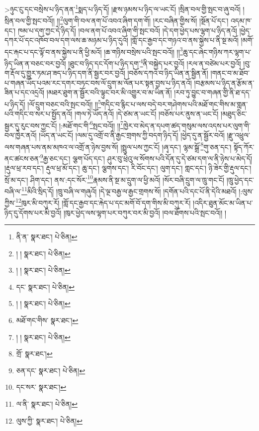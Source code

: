 >ཉུང་ངུ་དང་བསྲེས་པ་ཉིད་ནན་\footnote{ནི་ན་  སྣར་ཐང་།  པེ་ཅིན། }སྨད་པ་ཉིད་དོ། །རྫས་ཉམས་པ་ཉིད་ལ་ཡང་ངོ། །སྲིན་བལ་གྱི་སྤང་བ་ཞུ་བའོ། །སྲིན་བལ་གྱི་སྤང་བའོ།། །།\footnote{། །  སྣར་ཐང་།  པེ་ཅིན། }ལུག་གི་བལ་ནག་པོ་འབའ་ཞིག་དག་གོ། །རང་བཞིན་གྱིས་སོ། །སྔོན་པོ་དང་། འདམ་ཁ་དང་། ཁམ་པ་དག་ཀྱང་དེ་ཉིད་དོ། །བལ་ནག་པོ་འབའ་ཞིག་གི་སྤང་བའོ། །དེ་དག་ཕྱེད་པས་ལྷག་པ་ཉིད་ནའོ། །ཕྱེད་དཀར་པོ་དང་འཁོབ་བལ་དག་ལས་ཆ་མཉམ་པ་ཉིད་དུའོ། །གློ་དང་རྒྱབ་དང་གཉའ་བ་ནས་སྐྱེས་པ་ནི་སྔ་མའོ། །མགོ་དང་རྐང་པ་དང་ལྟོ་བ་ནས་སྐྱེས་པ་ནི་ཕྱི་མའོ། །ཆ་གཉིས་བསྲེས་པའི་སྤང་བའོ།། །།\footnote{། །  སྣར་ཐང་།  པེ་ཅིན། }ཆུ་དང་ཞེང་གཉིས་ཀར་ལྷག་པ་ཉིད་ཡིན་ན་བཅང་བར་བྱའོ། །ཐུང་བ་ཉིད་དང་དོག་པ་ཉིད་དག་\footnote{དང་  སྣར་ཐང་།  པེ་ཅིན། }ནི་བསྐྱེད་པར་བྱའོ། །རལ་ན་བཙེམ་པར་བྱའོ། །བུ་ག་རྡོལ་དུ་གྱུར་ཏམ་ཤ་ཟད་པ་ཉིད་དག་ནི་སྦྱར་བར་བྱའོ། །བཅོས་དཀའ་བ་ཉིད་ཡིན་ན་སྦྱིན་ནོ། །གནང་བ་མ་ཐོབ་པ་གཞན་ཡོད་པའམ་རང་དགར་བཏང་བས་ལོ་དྲུག་མ་ལོན་པར་སྟན་བྱས་པ་ཉིད་ནའོ། །བརྩམས་པ་ཉིད་ན་རྩོམ་ན་ཟིན་པ་དང་འདྲའོ། །མཐར་ཐུག་ན་སྦྱོར་བའི་ལྟུང་བར་མི་འགྱུར་བ་མ་ཡིན་ནོ། །རབ་ཏུ་བྱུང་བ་གཞན་གྱི་ནི་ཐ་དད་པ་ཉིད་དོ། །ལོ་དྲུག་བཅང་བའི་སྤང་བའོ།། །།\footnote{། །  སྣར་ཐང་།  པེ་ཅིན། }གདིང་བ་རྙིང་པ་ལས་བདེ་བར་གཤེགས་པའི་མཐོ་གང་གིས་མ་གླན་པའི་གདིང་བ་སར་པ་སྤྱོད་ནའོ། །གལ་ཏེ་ཡོད་ནའོ། །དེ་ཙམ་ན་ཡང་ངོ། །བཅོས་པར་ནུས་ན་ཡང་ངོ། །མཐུད་ཅིང་སྦྱར་དུ་རུང་བས་ཀྱང་ངོ། །:མཐོ་གང་གི་\footnote{མཐོ་གང་གིས་  སྣར་ཐང་། }སྤང་བའོ།། །།\footnote{། །  སྣར་ཐང་།  པེ་ཅིན། }ཁྱེར་བ་མེད་ན་དཔག་ཚད་གསུམ་ལས་འདས་པར་ལུག་གི་བལ་ཁྱེར་ནའོ། །ཡོད་ན་ཡང་ངོ། །ལམ་དུ་འགྲོ་བ་ནི་རྒྱང་གྲགས་ཀྱི་བདག་ཉིད་དོ། །ཕྱེད་དུ་ན་སྦྱོར་བའོ། །རྫུ་འཕྲུལ་ལས་གཞན་པས་ནམ་མཁའ་ལ་འགྲོ་ན་ཉེས་བྱས་སོ། །སྤྲུལ་པས་ཀྱང་ངོ། །ཞྭ་དང་། ལྷམ་སྒྲོ་\footnote{གྲོ་  སྣར་ཐང་། }གུ་ཅན་དང་། སྟོད་ཀོར་ནང་ཚངས་ཅན་\footnote{ཅན་དང་  སྣར་ཐང་།  པེ་ཅིན། }རྒྱ་ཅང་དང་། ལྕག་པོད་དང་། ཤུར་བུ་ཕྲེའུ་ལ་སོགས་པའི་དོན་དུ་དེ་ཙམ་དག་ལ་ནི་ཉེས་པ་མེད་དོ། །རྡུལ་ཕྲ་རབ་དང་། རྡུལ་ཕྲ་མོ་དང་། ཆུ་དང་། ལྕགས་དང་། རི་བོང་དང་། ལུག་དང་། གླང་དང་། ཉི་ཟེར་གྱི་རྡུལ་དང་། སྲོ་མ་དང་། ཤིག་དང་། ནས་:དང་སོར་\footnote{དང་སར་  སྣར་ཐང་། }རྣམས་ནི་སྔ་མ་དྲུག་ལ་ཕྱི་མའོ། །སོར་བཞི་དྲུག་ལ་ཁྲུ་གང་ངོ། །ཁྲུ་ཕྱེད་དང་བཞི་ལ་\footnote{ལ་ནི་  སྣར་ཐང་།  པེ་ཅིན། }མིའི་སྲིད་དོ། །ཁྲུ་བཞི་ལ་གཞུའོ། །དེ་ལྔ་བརྒྱ་ལ་རྒྱང་གྲགས་སོ། །དགོན་པའི་དང་པོ་ནི་དེའི་མཐའོ། །:ལུས་ཀྱིས་\footnote{ལུས་ཀྱི་  སྣར་ཐང་།  པེ་ཅིན། }ཁུར་མི་བཀུར་རོ། །གློ་དང་རྒྱབ་དང་རྐེད་པ་དང་མགོ་བོ་དག་གིས་མི་བཀུར་རོ། །འདིར་ཐུན་མོང་མ་ཡིན་པ་ཉིད་དུ་དོགས་པར་མི་བྱའོ། །ཁུར་ཕྱེད་ལས་ལྷག་པར་བཀུར་བར་མི་བྱའོ། །བལ་ཐོགས་པའི་སྤང་བའོ།། །
